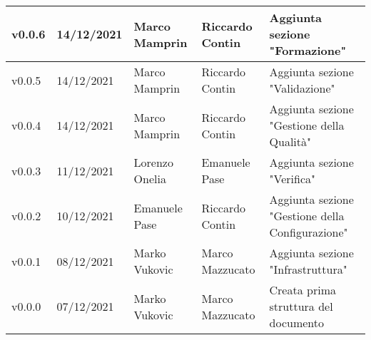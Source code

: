 {\begin{longtable}{|C{1.8cm}|C{2.1cm}|C{2cm}|C{2.4cm}|L{4.4cm}|}
  v0.0.6     & 14/12/2021    & Marco Mamprin    & Riccardo Contin       & Aggiunta sezione "Formazione" \\ \hline
  v0.0.5     & 14/12/2021    & Marco Mamprin    & Riccardo Contin       & Aggiunta sezione "Validazione" \\ \hline
  v0.0.4     & 14/12/2021    & Marco Mamprin    & Riccardo Contin       & Aggiunta sezione "Gestione della Qualità" \\ \hline
  v0.0.3     & 11/12/2021    & Lorenzo Onelia   & Emanuele Pase         & Aggiunta sezione "Verifica" \\ \hline
  v0.0.2     & 10/12/2021    & Emanuele Pase    & Riccardo Contin       & Aggiunta sezione "Gestione della Configurazione" \\ \hline
  v0.0.1     & 08/12/2021    & Marko Vukovic    & Marco Mazzucato       & Aggiunta sezione "Infrastruttura" \\ \hline
  v0.0.0     & 07/12/2021    & Marko Vukovic    & Marco Mazzucato       & Creata prima struttura del documento \\ \hline
\end{longtable}}

\renewcommand\arraystretch{1}
